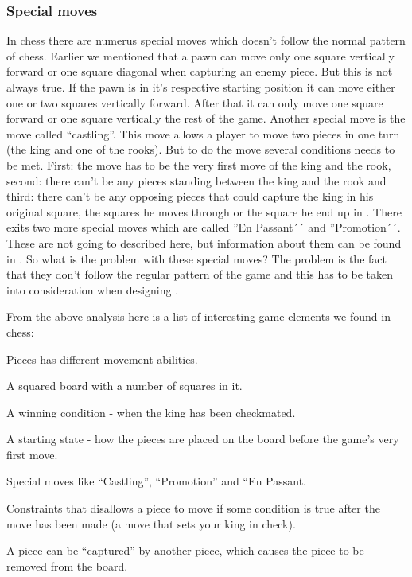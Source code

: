 \subsubsection{Special moves} 
In chess there are numerus special moves which doesn't follow the normal pattern of chess. Earlier we mentioned that a pawn can move only one square vertically forward or one square diagonal when capturing an enemy piece. But this is not always true. If the pawn is in it's respective starting position it can move either one or two squares vertically forward. After that it can only move one square forward or one square vertically the rest of the game. Another special move is the move called ``castling''. This move allows a player to move two pieces in one turn (the king and one of the rooks). But to do the move several conditions needs to be met. First: the move has to be the very first move of the king and the rook, second: there can't be any pieces standing between the king and the rook and third: there can't be any opposing pieces that could capture the king in his original square, the squares he moves through or the square he end up in \cite{chessrules}. There exits two more special moves which are called ''En Passant´´ and ''Promotion´´. These are not going to described here, but information about them can be found in \cite{chessrules}. So what is the problem with these special moves? The problem is the fact that they don't follow the regular pattern of the game and this has to be taken into consideration when designing \productname{}.


From the above analysis here is a list of interesting game elements we found in chess:
\begin{dlist}
\item Pieces has different movement abilities.
\item A squared board with a number of squares in it.
\item A winning condition - when the king has been checkmated.
\item A starting state - how the pieces are placed on the board before the game's very first move.
\item Special moves like ``Castling'', ``Promotion'' and ``En Passant.
\item Constraints that disallows a piece to move if some condition is true after the move has been made (a move that sets your king in check).
\item A piece can be ``captured'' by another piece, which causes the piece to be removed from the board.
\end{dlist}
